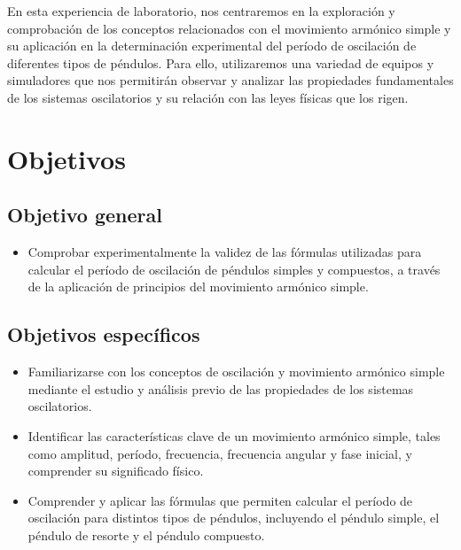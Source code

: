 \documentclass[twocolumn, 12pt]{article}
\begin{document}
\vspace{.5cm}

En esta experiencia de laboratorio, nos centraremos en la
exploración y comprobación de los conceptos relacionados
con el movimiento armónico simple y su aplicación en la
determinación experimental del período de oscilación de
diferentes tipos de péndulos. Para ello, utilizaremos una
variedad de equipos y simuladores que nos permitirán
observar y analizar las propiedades fundamentales de los
sistemas oscilatorios y su relación con las leyes físicas
que los rigen.

\section{Objetivos}

\subsection{Objetivo general}

\begin{itemize}[label=$\triangleright$]
    \item Comprobar experimentalmente la validez de las fórmulas
          utilizadas para calcular el período de oscilación de
          péndulos simples y compuestos, a través de la aplicación de
          principios del movimiento armónico simple.
\end{itemize}

\subsection{Objetivos específicos}

\begin{itemize}[label=$\triangleright$]
    \item Familiarizarse con los conceptos de oscilación y movimiento
          armónico simple mediante el estudio y análisis previo de
          las propiedades de los sistemas oscilatorios.

    \item Identificar las características clave de un movimiento
          armónico simple, tales como amplitud, período, frecuencia,
          frecuencia angular y fase inicial, y comprender su
          significado físico.

    \item Comprender y aplicar las fórmulas que permiten calcular el
          período de oscilación para distintos tipos de péndulos,
          incluyendo el péndulo simple, el péndulo de resorte y el
          péndulo compuesto.
\end{itemize}
\end{document}
